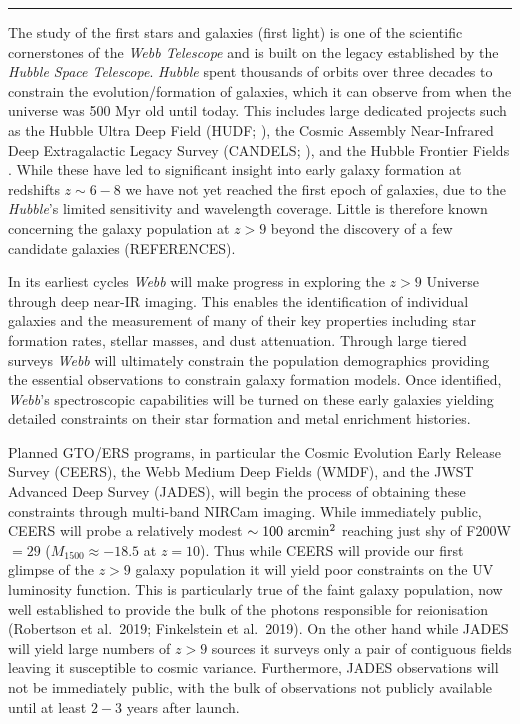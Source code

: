 \documentclass[12pt]{article}
\begin{document}
\noindent\textcolor[RGB]{160,160,160}{\rule{\linewidth}{0.2pt}}

The study of the first stars and galaxies (first light) is one of the scientific cornerstones of the \emph{Webb Telescope} and is built on the legacy established by the \emph{Hubble Space Telescope}. \emph{Hubble} spent thousands of orbits over three decades to constrain the evolution/formation of galaxies, which it can observe from when the universe was 500 Myr old until today.  This includes large dedicated projects such as the Hubble Ultra Deep Field (HUDF; \citealt{Beckwith2006, Bouwens2010, Dunlop2013}), the Cosmic Assembly Near-Infrared Deep Extragalactic Legacy Survey (CANDELS; \citealt{Grogin2011, Koekemoer2011}), and the Hubble Frontier Fields \citep{Lotz2017}. While these have led to significant insight into early galaxy formation  at redshifts $z \sim 6-8$ we have not yet reached the first epoch of galaxies, due to the \emph{Hubble}'s limited sensitivity and wavelength coverage. Little is therefore known concerning the galaxy population at $z > 9$ beyond the discovery of a few candidate galaxies (REFERENCES).  

In its earliest cycles \emph{Webb} will make progress in exploring the $z>9$ Universe through deep near-IR imaging. This enables the identification of individual galaxies and the measurement of many of their key properties including star formation rates, stellar masses, and dust attenuation. Through large tiered surveys \emph{Webb} will ultimately constrain the population demographics providing the essential observations to constrain galaxy formation models. Once identified, \emph{Webb}'s spectroscopic capabilities will be turned on these early galaxies yielding detailed constraints on their star formation and metal enrichment histories.

Planned GTO/ERS programs, in particular the Cosmic Evolution Early Release Survey (CEERS), the Webb Medium Deep Fields (WMDF), and the JWST Advanced Deep Survey (JADES), will begin the process of obtaining these constraints through multi-band NIRCam imaging. While immediately public, CEERS will probe a relatively modest $\sim 100\ {\rm arcmin^{2}}$ reaching just shy of F200W$=29$ ($M_{1500}\approx -18.5$ at $z=10$). Thus while CEERS will provide our first glimpse of the $z>9$ galaxy population it will yield poor constraints on the UV luminosity function. This is particularly true of the faint galaxy population, now well established to provide the bulk of the photons responsible for reionisation (Robertson et al.\ 2019; Finkelstein et al.\ 2019). On the other hand while JADES will  yield large numbers of $z > 9$ sources it surveys only a pair of contiguous fields leaving it susceptible to cosmic variance. Furthermore, JADES observations will not be immediately public, with the bulk of observations not publicly available until at least $2-3$ years after launch. 
\end{document}
